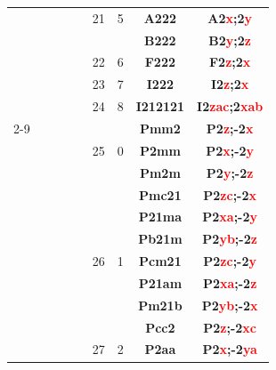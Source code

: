 \documentclass{article}      %
\begin{document}
\begin{small}
\begin{longtable}[c]{|c|c|c|c|c|c|c|c|c|}
 & & & & &\textrm{21} &5 &\textbf{A222} &\textbf{A2\textcolor{red}{x};2\textcolor{red}{y}}  \\\cline{8-9}
 & & & & & & &\textbf{B222} &\textbf{B2\textcolor{red}{y};2\textcolor{red}{z}}  \\\cline{6-9}
 & & & & &\textrm{22} &6 &\textbf{F222} &\textbf{F2\textcolor{red}{z};2\textcolor{red}{x}}  \\\cline{6-9}
 & & & & &\textrm{23} &7 &\textbf{I222} &\textbf{I2\textcolor{red}{z};2\textcolor{red}{x}}  \\\cline{6-9}
 & & & & &\textrm{24} &8 &\textbf{I212121} &\textbf{I2\textcolor{red}{zac};2\textcolor{red}{xab}}  \\\cline{
 2-9}
          &  & & & &  & &\textbf{Pmm2}         &\textbf{P2\textcolor{red}{z};-2\textcolor{red}{x}}\\\cline{8-9}           
	  &  & & & &\textrm{25}  &\textrm{0} &\textbf{P2mm}         &\textbf{P2\textcolor{red}{x};-2\textcolor{red}{y}}\\\cline{8-9}           
          &  & & & &  & &\textbf{Pm2m}         &\textbf{P2\textcolor{red}{y};-2\textcolor{red}{z}}\\\cline{6-9}           
          &  & & & &  & &\textbf{Pmc21}       &\textbf{P2\textcolor{red}{zc};-2\textcolor{red}{x}}\\\cline{8-9}          
          &  & & & &  & &\textbf{P21ma}       &\textbf{P2\textcolor{red}{xa};-2\textcolor{red}{y}}\\\cline{8-9}          
          &  & & & &  & &\textbf{Pb21m}       &\textbf{P2\textcolor{red}{yb};-2\textcolor{red}{z}}\\\cline{8-9}          
	  &  & & & &\textrm{26}  &\textrm{1} &\textbf{Pcm21}       &\textbf{P2\textcolor{red}{zc};-2\textcolor{red}{y}}\\\cline{8-9}          
          &  & & & &  & &\textbf{P21am}       &\textbf{P2\textcolor{red}{xa};-2\textcolor{red}{z}}\\\cline{8-9}        
          &  & & & &  & &\textbf{Pm21b}       &\textbf{P2\textcolor{red}{yb};-2\textcolor{red}{x}}\\\cline{6-9}          
          &  & & & &  & &\textbf{Pcc2}         &\textbf{P2\textcolor{red}{z};-2\textcolor{red}{xc}}\\\cline{8-9}          
	  &  & & & &\textrm{27}  &\textrm{2} &\textbf{P2aa}         &\textbf{P2\textcolor{red}{x};-2\textcolor{red}{ya}}\\\cline{8-9}          

\end{longtable}
\end{small}
\end{document}
